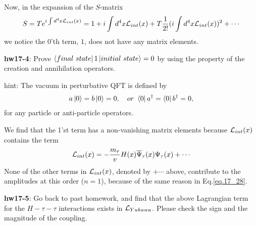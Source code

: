 \documentclass[12pt]{article}
\def\dgr{\dagger}
\begin{document}
Now, in the expansion of the $S$-matrix
\begin{eqnarray}
  S = T e^{ i\int d^4x {\cal L}_{int}(x) }
  = 1
  + i\int d^4x {\cal L}_{int}(x)
  + T \frac{1}{2!} (i\int d^4x {\cal L}_{int}(x))^2
  + \cdots \label{eq.17_27}
\end{eqnarray}
 we notice the $0$'th term, $1$, does not have any matrix elements.

{\bf hw17-4}: Prove $\bra{final~state} 1 \ket{initial~state} = 0$ by using the
  property of the creation and annihilation operators.

hint: The vacuum in perturbative QFT is defined by
\begin{eqnarray}
  a\ket{0}=b\ket{0}=0,~~~or~\bra{0}a^\dgr = \bra{0}b^\dgr = 0,\label{eq.17_28}
\end{eqnarray}
  for any particle or anti-particle operators.

  We find that the 1'st term has a non-vanishing matrix elements because
  ${\cal L}_{int}(x)$ contains the term
\begin{eqnarray}
  {\cal L}_{int}(x)  =  -\frac{m_\tau}{v} H(x) {\overline \Psi}_\tau(x) \Psi_\tau(x) + \cdots \label{eq.17_29}
\end{eqnarray}
  None of the other terms in ${\cal L}_{int}(x)$, denoted by $+\cdots$ above, contribute
  to the amplitudes at this order ($n=1$), because of the same reason in Eq.\ref{eq.17_28}.

{\bf hw17-5}: Go back to past homework, and find that the above Lagrangian
  term for the $H-\tau-\tau$ interactions exists in ${\cal L}_{Yukawa}$. Please
  check the sign and the magnitude of the coupling.
\end{document}
